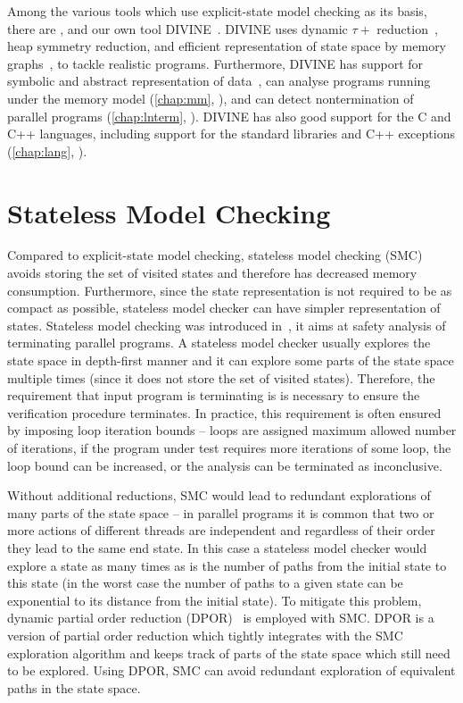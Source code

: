 Among the various tools which use explicit-state model checking as its basis,
there are , and our own tool DIVINE~\cite{DIVINEToolPaper2017}.
DIVINE uses dynamic $\tau+$ reduction~\cite{TODO}, heap symmetry reduction, and
efficient representation of state space by memory graphs~\cite{RSCB2018}, to
tackle realistic programs.
Furthermore, DIVINE has support for symbolic and abstract representation of
data~\cite{TODO}, can analyse programs running under the \xtso memory model
(\autoref{chap:mm}, \cite{SB2018x86tso}), and can detect nontermination of
parallel programs (\autoref{chap:lnterm}, \cite{SB2019}).
DIVINE has also good support for the C and C++ languages, including support for
the standard libraries and C++ exceptions (\autoref{chap:lang},
\cite{SRB2017}).

\section{Stateless Model Checking}

Compared to explicit-state model checking, stateless model checking (SMC)
avoids storing the set of visited states and therefore has decreased memory
consumption.
Furthermore, since the state representation is not required to be as compact as
possible, stateless model checker can have simpler representation of states.
Stateless model checking was introduced in~\cite{Godefroid1997}, it aims at
safety analysis of terminating parallel programs.
A stateless model checker usually explores the state space in depth-first
manner and it can explore some parts of the state space multiple times (since
it does not store the set of visited states).
Therefore, the requirement that input program is terminating is is necessary
to ensure the verification procedure terminates.
In practice, this requirement is often ensured by imposing loop iteration
bounds -- loops are assigned maximum allowed number of iterations, if the
program under test requires more iterations of some loop, the loop bound can be
increased, or the analysis can be terminated as inconclusive.

Without additional reductions, SMC would lead to redundant explorations of many
parts of the state space -- in parallel programs it is common that two or more
actions of different threads are independent and regardless of their order they
lead to the same end state.
In this case a stateless model checker would explore a state as many times as
is the number of paths from the initial state to this state (in the worst case
the number of paths to a given state can be exponential to its distance from
the initial state).
To mitigate this problem, dynamic partial order reduction
(DPOR)~\cite{Flanagan2005dpor} is employed with SMC.
DPOR is a version of partial order reduction which tightly integrates with
the SMC exploration algorithm and keeps track of parts of the state space which
still need to be explored.
Using DPOR, SMC can avoid redundant exploration of equivalent paths in the
state space.

